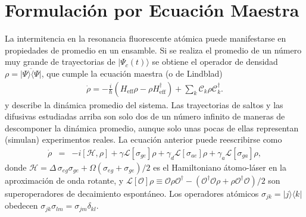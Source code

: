 \documentclass[superscriptaddress,12pt,amsmath]{revtex4-2}
\begin{document}
\section{Formulaci\'on por Ecuaci\'on Maestra}
La intermitencia en la resonancia fluorescente at\'omica puede 
manifestarse en propiedades de promedio en un ensamble.  Si se realiza el 
promedio de un n\'umero muy grande de trayectorias de $|\Psi_c(t)\rangle$ 
se obtiene el operador de densidad 
$\rho= \overline{ | \Psi \rangle \langle \Psi | }$, que cumple la ecuaci\'on 
maestra (o de Lindblad) 
%
\begin{eqnarray}
\dot{\rho} = -\frac{i}{\hbar} (H_{\mathrm{eff}} \rho -\rho H_{\mathrm{eff}}^{\dag} )
	+\sum_k \mathcal{C}_k \rho \mathcal{C}_k^\dag .
\end{eqnarray}
y describe la din\'amica promedio del sistema. Las trayectorias de saltos 
y las difusivas estudiadas arriba son solo dos de un n\'umero infinito de 
maneras de descomponer la din\'amica promedio, aunque solo unas 
pocas de ellas representan (simulan) experimentos reales. La ecuaci\'on 
anterior puede reescribirse como 
%
\begin{eqnarray}
\dot{\rho} &=& -i [\mathcal{H},\rho] +{\gamma}\mathcal{L}[\sigma_{ge}] \rho 
	+{\gamma_d} \mathcal{L}[\sigma_{ae}] \rho 	
	+ {\gamma_a} \mathcal{L}[\sigma_{ga}] \rho   , 
\end{eqnarray}
donde $\mathcal{H} = \Delta \, \sigma_{eg} \sigma_{ge} 
	+\Omega ( \sigma_{eg} +\sigma_{ge})/2$ 
es el Hamiltoniano \'atomo-l\'aser en la aproximaci\'on de onda rotante, y 
$\mathcal{L}[\mathcal{O}]\rho \equiv \mathcal{O}\rho\mathcal{O}^\dagger 
 - (\mathcal{O}^\dagger\mathcal{O}\rho 
+\rho\mathcal{O}^\dagger\mathcal{O})/2$ 
son superoperadores de decaimiento espont\'aneo. Los operadores 
at\'omicos  $\sigma_{jk} = |j \rangle\langle k|$ obedecen 
$\sigma_{jk} \sigma_{lm} = \sigma_{jm} \delta_{kl}$.  
\end{document}

